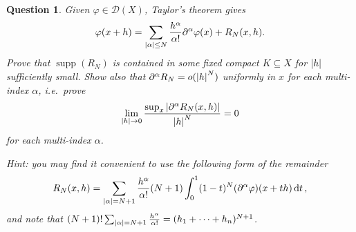 \documentclass{article}
\theoremstyle{plain}
\newtheorem{question}{Question}
\theoremstyle{remark}
\renewcommand{\phi}{\varphi}
\newcommand{\Cal}{\mathcal}
\newcommand{\DD}{\Cal D}
\newcommand\pt\partial
\DeclareMathOperator{\supp}{supp}
\begin{document}
\begin{question}
	Given $\phi \in \DD(X)$, Taylor's theorem gives
	\[
	\phi(x+h) = \sum_{\abs{\alpha} \leq N} \frac{h^\alpha}{\alpha!} \pt^\alpha \phi(x) + R_N(x, h).
	\]
	Prove that $\supp(R_N)$ is contained in some fixed compact $K \subseteq X$ for $\abs{h}$ sufficiently small. Show also that $\pt^\alpha R_N = o(\abs{h}^N)$ uniformly in $x$ for each multi-index $\alpha$, i.e.\ prove 
	\[
	\lim_{\abs{h}\to 0} \frac{\sup_x \abs{\pt^\alpha R_N(x, h)}}{\abs{h}^N} = 0
	\]
	for each multi-index $\alpha$.  
	
	\emph{Hint: you may find it convenient to use the following form of the remainder}
	\[
	R_N(x, h) = \sum_{\abs{\alpha} = N+1} \frac{h^\alpha}{\alpha!}(N+1)\int_0^1 (1-t)^N (\pt^\alpha\phi)(x + th)\dd{t},
	\]
	\emph{and note that} $(N+1)! \sum_{\abs{\alpha} = N+1} \frac{h^\alpha}{\alpha!} = (h_1 + \dotsb + h_n)^{N+1}$. 
\end{question}
\end{document}
